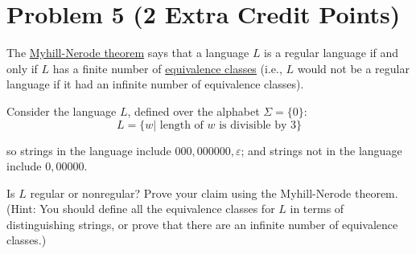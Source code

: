 \documentclass[letterpaper,11pt,twoside]{article}
\theoremstyle{plain}
\theoremstyle{definition}
\theoremstyle{remark}
\theoremstyle{restate}
\begin{document}
\clearpage
\section{Problem 5 (2 Extra Credit Points)}

The \href{https://en.wikipedia.org/wiki/Myhill\%E2\%80\%93Nerode_theorem}{Myhill-Nerode theorem} says that a language $L$ is a regular language if and only if $L$ has a finite number of \href{https://en.wikipedia.org/wiki/Equivalence_class}{equivalence classes}  (i.e., $L$ would not be a regular language if it had an infinite number of equivalence classes).
\newline

Consider the language $L$, defined over the alphabet $\Sigma=\{0\}$:
$$L=\{w | \text{ length of } w \text{ is divisible by }3\}$$

so strings in the language include $000,000000,\varepsilon$; and strings not in the language include $0,00000$.
\newline

Is $L$ regular or nonregular? Prove your claim using the Myhill-Nerode theorem. (Hint: You should define all the equivalence classes for $L$ in terms of distinguishing strings, or prove that there are an infinite number of equivalence classes.)\\
\end{document}
